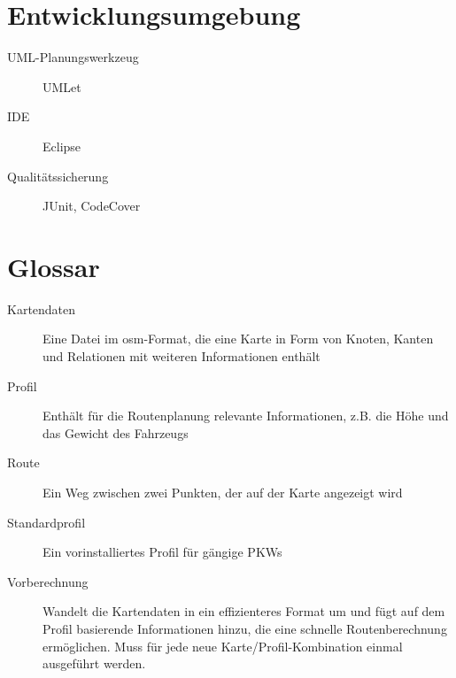 \documentclass[a4paper, 11pt]{article}
\begin{document}
\section{Entwicklungsumgebung}
\begin{description}
  \item[UML-Planungswerkzeug] UMLet
  \item[IDE] Eclipse
  \item[Qualitätssicherung] JUnit, CodeCover
\end{description}
\section{Glossar}
\begin{description}
\item[Kartendaten] Eine Datei im osm-Format, die eine Karte in Form von Knoten, Kanten und Relationen mit weiteren Informationen enthält\\
\item[Profil]
Enthält für die Routenplanung relevante Informationen, z.B. die Höhe und das Gewicht des Fahrzeugs\\
\item[Route]
Ein Weg zwischen zwei Punkten, der auf der Karte angezeigt wird\\
\item[Standardprofil]
Ein vorinstalliertes Profil für gängige PKWs\\
\item[Vorberechnung] Wandelt die Kartendaten in ein effizienteres Format um und fügt auf dem Profil basierende Informationen hinzu, die eine schnelle Routenberechnung ermöglichen. Muss für jede neue Karte/Profil-Kombination einmal ausgeführt werden.
\end{description}
\end{document}
